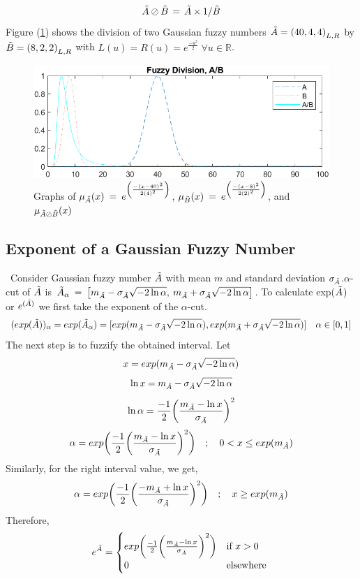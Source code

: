 \documentclass{article}
\begin{document}
\begin{equation}
    \Tilde{A}\oslash\Tilde{B}\,=\,\Tilde{A} \times1/\Tilde{B}
\end{equation}\newline Figure (\ref{fig:div_img}) shows the division of two Gaussian fuzzy numbers $\Tilde{A} = \left(40,4,4\right)_{L,R}$ by $\Tilde{B} = \left(8,2,2\right)_{L,R}$ with $L(u) = R(u) = e^{\frac{-u^2}{2}} \; \forall u\in\mathbb{R}$.


\begin{figure}
    \centering
    \includegraphics[scale=1]{division.png}
    \caption{\label{fig:div_img} Graphs of $\mu_{\Tilde{A}}(x) \:=\:e^{\left( \frac{-(x-40)^2}{2(4)^{2}} \right)}$, $\mu_{\Tilde{B}}(x) \:=\:e^{\left( \frac{-(x-8)^2}{2(2)^{2}} \right)}$, and $\mu_{\Tilde{A}\oslash\Tilde{B}}(x)$}
    \label{fig:div_img}
\end{figure}


\subsection{Exponent of a Gaussian Fuzzy Number}\
Consider Gaussian fuzzy number $\Tilde{A}$ with mean $m$  and standard deviation $\sigma_{\Tilde{A}}$.\newline $\alpha$-cut of $\Tilde{A}$ is $\Tilde{A}_\alpha \: = \: \left[m_{\Tilde{A}}-\sigma_{\Tilde{A}}\sqrt{-2\ln{\alpha}}, \: m_{\Tilde{A}}+\sigma_{\Tilde{A}}\sqrt{-2\ln{\alpha}} \right]$.\newline 
To calculate exp($\Tilde{A}$) or $e^{(\Tilde{A})}$ we first take the exponent of the $\alpha$-cut.
\[(exp(\Tilde{A}))_\alpha = exp(\Tilde{A}_\alpha)=[exp(m_{\Tilde{A}}-\sigma_{\Tilde{A}}\sqrt{-2\ln{\alpha}}),exp(m_{\Tilde{A}}+\sigma_{\Tilde{A}}\sqrt{-2\ln{\alpha}})]\quad\alpha\in [0,1]\]
The next step is to fuzzify the obtained interval. Let
\[x=exp(m_{\Tilde{A}}-\sigma_{\Tilde{A}}\sqrt{-2\ln{\alpha}})\]
\[\ln{x}=m_{\Tilde{A}}-\sigma_{\Tilde{A}}\sqrt{-2\ln{\alpha}}\]
\[\ln{\alpha}=\frac{-1}{2}\biggl({\frac{m_{\Tilde{A}}-\ln{x}}{\sigma_{\Tilde{A}}}}\biggr)^2\]
\[\alpha=exp\biggl(\frac{-1}{2}\biggl({\frac{m_{\Tilde{A}}-\ln{x}}{\sigma_{\Tilde{A}}}}\biggr)^2\biggr)\quad ;\quad 0 < x\leq exp(m_{\Tilde{A}})\]
Similarly, for the right interval value, we get, 
\[\alpha=exp\biggl(\frac{-1}{2}\biggl({\frac{- m_{\Tilde{A}}+\ln{x}}{\sigma_{\Tilde{A}}}}\biggr)^2\biggr)\quad ;\quad x\geq exp(m_{\Tilde{A}})\]
Therefore,
\[e^{\Tilde{A}}=\begin{cases}
        exp\biggl(\frac{-1}{2}\biggl({\frac{m_{\Tilde{A}}-\ln{x}}{\sigma_{\Tilde{A}}}}\biggr)^2\biggr)& \text{if } x > 0\\
        0 & \text{elsewhere } 
        \end{cases}\]
\end{document}
